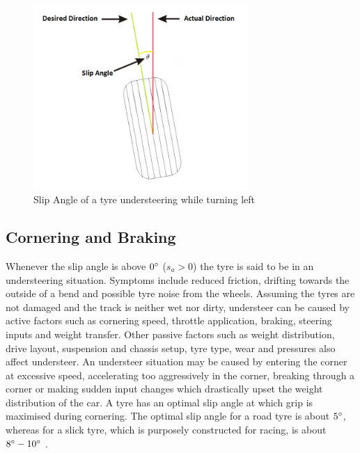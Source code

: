 \begin{figure}[!htb]
	\centering
	\includegraphics[height=7cm]{images/slipangle}
	\caption{Slip Angle of a tyre understeering while turning left}
	\label{fig:slipangle}
\end{figure}

\subsection{Cornering and Braking}
Whenever the slip angle is above $0\degree$ ($s_a > 0$) the tyre is said to be in an understeering situation. Symptoms include reduced friction, drifting towards the outside of a bend and possible tyre noise from the wheels. Assuming the tyres are not damaged and the track is neither wet nor dirty, understeer can be caused by active factors such as cornering speed, throttle application, braking, steering inputs and weight transfer. Other passive factors such as weight distribution, drive layout, suspension and chassis setup, tyre type, wear and pressures also affect understeer. An understeer situation may be caused by entering the corner at excessive speed, accelerating too aggressively in the corner, breaking through a corner or making sudden input changes which drastically upset the weight distribution of the car. A tyre has an optimal slip angle at which grip is maximised during cornering. The optimal slip angle for a road tyre is about $5\degree$, whereas for a slick tyre, which is purposely constructed for racing, is about $8\degree-10\degree$ \cite{beckman1991physics}.


